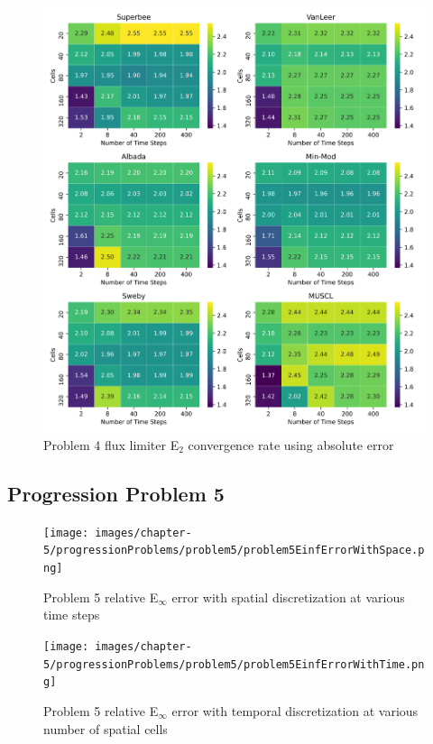 \clearpage

\begin{figure}[p]
    \centering
    \includegraphics[width=6in]{images/chapter-5/progressionProblems/problem4/problem4E2FluxLimiterConvergenceRate.png}
    \caption{Problem 4 flux limiter E${}_{2}$ convergence rate using absolute error}
    \label{fig:problem4_l2error_fluxlimiter_convergence_rate}
\end{figure}

\clearpage

\subsection{Progression Problem 5}
\begin{figure}[p]
    \centering
    \texttt{[image: images/chapter-5/progressionProblems/problem5/problem5EinfErrorWithSpace.png]}
    \caption{Problem 5 relative E${}_{\infty}$ error with spatial discretization at various time steps }
    \label{fig:problem5_linferror_spatial_results}
\end{figure}

\clearpage

\begin{figure}[p]
    \centering
    \texttt{[image: images/chapter-5/progressionProblems/problem5/problem5EinfErrorWithTime.png]}
    \caption{Problem 5 relative E${}_{\infty}$ error with temporal discretization at various number of spatial cells}
    \label{fig:problem5_linferror_time_results}
\end{figure}


